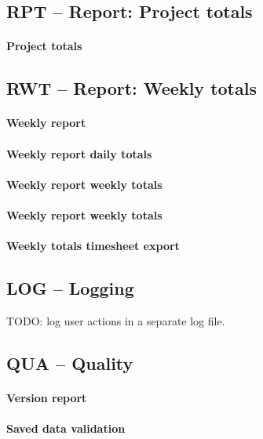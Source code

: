 \subsection{RPT -- Report: Project totals}
\paragraph{Project totals}

\subsection{RWT -- Report: Weekly totals}
\paragraph{Weekly report}
\paragraph{Weekly report daily totals}
\paragraph{Weekly report weekly totals}
\paragraph{Weekly report weekly totals}
\paragraph{Weekly totals timesheet export}

\subsection{LOG -- Logging}
TODO: log user actions in a separate log file.

\subsection{QUA -- Quality}
\paragraph{Version report}
\paragraph{Saved data validation}
